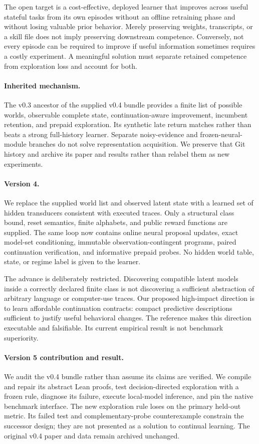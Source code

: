 \documentclass[10pt,twocolumn]{article}
\begin{document}
The open target is a cost-effective, deployed learner that improves across useful
stateful tasks from its own episodes without an offline retraining phase and
without losing valuable prior behavior. Merely preserving weights, transcripts,
or a skill file does not imply preserving downstream competence. Conversely,
not every episode can be required to improve if useful information sometimes
requires a costly experiment. A meaningful solution must separate retained
competence from exploration loss and account for both.

\paragraph{Inherited mechanism.}
The v0.3 ancestor of the supplied v0.4 bundle provides a finite list of possible worlds,
observable complete state, continuation-aware improvement, incumbent retention,
and prepaid exploration. Its synthetic late return matches rather than beats a
strong full-history learner. Separate noisy-evidence and frozen-neural-module
branches do not solve representation acquisition. We preserve that Git history
and archive its paper and results rather than relabel them as new experiments.

\paragraph{Version 4.}
We replace the supplied world list and observed latent state with a learned set of
hidden transducers consistent with executed traces. Only a structural class
bound, reset semantics, finite alphabets, and public reward functions are supplied.
The same loop now contains online neural proposal updates, exact model-set
conditioning, immutable observation-contingent programs, paired continuation
verification, and informative prepaid probes. No hidden world table, state, or
regime label is given to the learner.

The advance is deliberately restricted. Discovering compatible latent models
inside a correctly declared finite class is not discovering a sufficient
abstraction of arbitrary language or computer-use traces. Our proposed
high-impact direction is to learn affordable continuation contracts: compact
predictive descriptions sufficient to justify useful behavioral changes. The
reference makes this direction executable and falsifiable. Its current empirical
result is not benchmark superiority.

\paragraph{Version 5 contribution and result.}
We audit the v0.4 bundle rather than assume its claims are verified. We compile
and repair its abstract Lean proofs, test decision-directed exploration with a
frozen rule, diagnose its failure, execute local-model inference, and pin the
native benchmark interface. The new exploration rule loses on the primary
held-out metric. Its failed test and complementary-probe counterexample constrain
the successor design; they are not presented as a solution to continual learning.
The original v0.4 paper and data remain archived unchanged.
\end{document}

